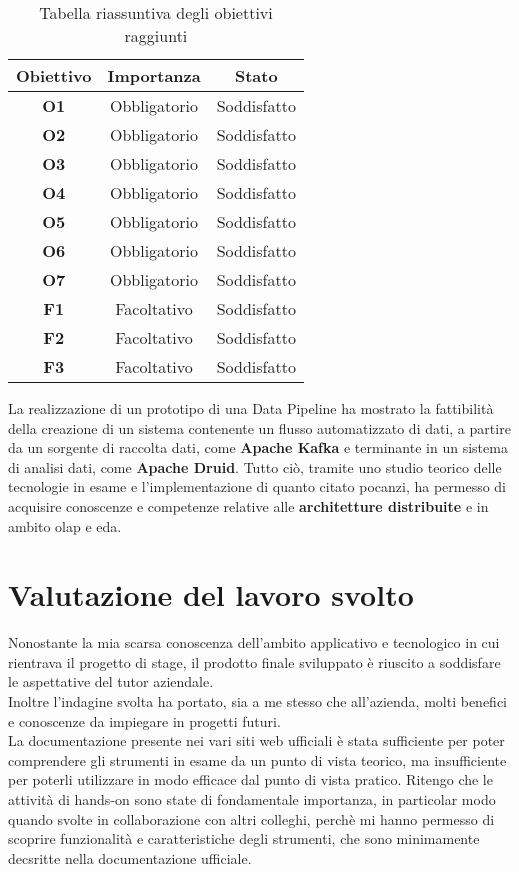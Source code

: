 \begin{table}[H]
    \centering
    \caption{Tabella riassuntiva degli obiettivi raggiunti}
    \label{tab:obiettivi_raggiunti}
    \begin{tabular}{|c|c|c|}
        \hline
        \textbf{Obiettivo} & \textbf{Importanza} & \textbf{Stato} \\\hline
        \textbf{O1} & Obbligatorio & Soddisfatto \\\hline
        \textbf{O2} & Obbligatorio & Soddisfatto\\\hline
        \textbf{O3} & Obbligatorio & Soddisfatto\\\hline
        \textbf{O4} & Obbligatorio & Soddisfatto \\ \hline
        \textbf{O5} & Obbligatorio & Soddisfatto \\\hline
        \textbf{O6} & Obbligatorio & Soddisfatto \\\hline
        \textbf{O7} & Obbligatorio & Soddisfatto \\\hline
        \textbf{F1} & Facoltativo & Soddisfatto\\\hline
        \textbf{F2} & Facoltativo & Soddisfatto \\\hline
        \textbf{F3} & Facoltativo & Soddisfatto\\\hline
    \end{tabular} 
\end{table}
\pagebreak
\noindent
La realizzazione di un prototipo di una \gls{Data Pipeline}{} ha mostrato la fattibilità della creazione di un sistema contenente un flusso automatizzato
di dati, a partire da un sorgente di raccolta dati, come \textbf{Apache Kafka} e terminante in un sistema di analisi dati, come \textbf{Apache Druid}.
Tutto ciò, tramite uno studio teorico delle tecnologie in esame e l'implementazione di quanto citato pocanzi, ha permesso di 
acquisire conoscenze e competenze relative alle \textbf{architetture distribuite} e in ambito \gls{olap}{} e \gls{eda}{}.  

\section{Valutazione del lavoro svolto}
Nonostante la mia scarsa conoscenza dell'ambito applicativo e tecnologico in cui rientrava il progetto di stage,
il prodotto finale sviluppato è riuscito a soddisfare le aspettative del tutor aziendale.\\
Inoltre l'indagine svolta 
ha portato, sia a me stesso che all'azienda,
 molti benefici e conoscenze da impiegare in progetti futuri.\\
La documentazione presente nei vari siti web ufficiali è stata sufficiente per poter comprendere gli strumenti in esame
da un punto di vista teorico, ma insufficiente 
per poterli utilizzare in modo efficace dal punto di vista pratico. Ritengo che 
le attività di \gls{hands-on}{} sono state di fondamentale importanza, in particolar modo 
quando svolte in collaborazione con altri colleghi, perchè mi hanno permesso di 
scoprire funzionalità e caratteristiche degli strumenti, che sono minimamente decsritte nella documentazione ufficiale.\\
